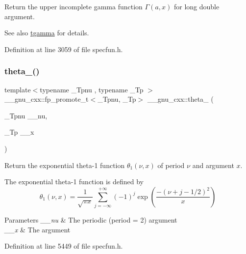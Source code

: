Return the upper incomplete gamma function $ \Gamma(a,x) $ for {\ttfamily long double} argument.

\begin{DoxySeeAlso}{See also}
\hyperlink{group__gnu__math__spec__func_ga73a634663e4eceb1e6bcf3fc16773b7b}{tgamma} for details. 
\end{DoxySeeAlso}


Definition at line 3059 of file specfun.\+h.

\mbox{\label{group__gnu__math__spec__func_gaa2e5a3a5f550fe032a596a8b01c878c0}} 
\subsubsection{\texorpdfstring{theta\+\_()}{theta\_1()}}
{\footnotesize\ttfamily template$<$typename \+\_\+\+Tpnu , typename \+\_\+\+Tp $>$ \\
\+\_\+\+\_\+gnu\+\_\+cxx\+::fp\+\_\+promote\+\_\+t$<$\+\_\+\+Tpnu, \+\_\+\+Tp$>$ \+\_\+\+\_\+gnu\+\_\+cxx\+::theta\+\_ (\begin{DoxyParamCaption}\item[{\+\_\+\+Tpnu}]{\+\_\+\+\_\+nu,  }\item[{\+\_\+\+Tp}]{\+\_\+\+\_\+x }\end{DoxyParamCaption})\hspace{0.3cm}{\ttfamily [inline]}}

Return the exponential theta-\/1 function $ \theta_1(\nu,x) $ of period $ \nu $ and argument $ x $.

The exponential theta-\/1 function is defined by \[ \theta_1(\nu,x) = \frac{1}{\sqrt{\pi x}} \sum_{j=-\infty}^{+\infty} (-1)^j \exp\left( \frac{-(\nu + j - 1/2)^2}{x} \right) \]


\begin{DoxyParams}{Parameters}
{\em \+\_\+\+\_\+nu} & The periodic (period = 2) argument \\
\hline
{\em \+\_\+\+\_\+x} & The argument \\
\hline
\end{DoxyParams}


Definition at line 5449 of file specfun.\+h.

\mbox{\label{group__gnu__math__spec__func_ga5bbf256b875da28132f9049f5984cb14}} 
